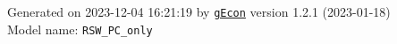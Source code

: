 \documentclass[10pt,a4paper]{article}
\numberwithin{equation}{section}
\begin{document}
\begin{landscape}
\begin{flushleft}{\large
Generated  on 2023-12-04 16:21:19 by \href{http://gecon.r-forge.r-project.org/}{\texttt{gEcon}} version 1.2.1 (2023-01-18)\\
Model name: \verb+RSW_PC_only+
}\end{flushleft}


\end{landscape}

\end{document}
